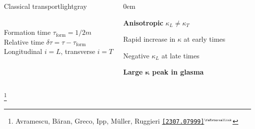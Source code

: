 \documentclass[aspectratio=169,11pt,usenames,dvipsnames]{beamer}
\renewcommand{\thefootnote}{\color{customblue}\faPaperPlaneO}
\newcommand\blfootnote[1]{%
  \begingroup
  \renewcommand\thefootnote{}\footnote{#1}%
  \addtocounter{footnote}{-1}%
  \endgroup
}
\begin{document}
\begin{frame}
\begin{columns}[onlytextwidth,t]
\begin{custombox2}{Classical transport}{lightgray}
\begin{varwidth}{0.95\textwidth}
\begin{itemize}
                \\[5pt]
                {\scriptsize\color{lightgray} Formation time $\tau_\mathrm{form}=1/2m$\\[1pt]
                Relative time $\delta\tau=\tau-\tau_\mathrm{form}$\\[-2pt]
                Longitudinal $i=L$, transverse $i=T$}
            \end{itemize}
            \end{varwidth}
        \end{custombox2}

        \begin{itemize}\itemsep0em 
            \footnotesize
            {\color{lightgray}\item {\bfseries Anisotropic} $\kappa_L\neq\kappa_T$
            \item Rapid increase in $\kappa$ at early times 
            \item Negative $\kappa_L$ at late times}
            \item {\bfseries\color{palgold}Large $\boldsymbol{\kappa}$ peak in glasma}
        \end{itemize}    
              
    \end{columns}
    \blfootnote{\scriptsize Avramescu, Băran, Greco, Ipp, Müller, Ruggieri  \href{https://arxiv.org/abs/2307.07999}{{\color{palgold}\texttt{[2307.07999]}$^\text{\tiny\faExternalLink}$}}}
\end{frame}

\end{document}
